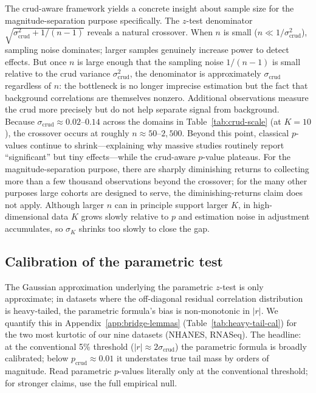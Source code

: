 The crud-aware framework yields a concrete insight about sample size for the magnitude-separation purpose specifically. The $z$-test denominator $\sqrt{\sigma_{\mathrm{crud}}^2 + 1/(n-1)}$ reveals a natural crossover. When $n$ is small ($n \ll 1/\sigma_{\mathrm{crud}}^2$), sampling noise dominates; larger samples genuinely increase power to detect effects. But once $n$ is large enough that the sampling noise $1/(n-1)$ is small relative to the crud variance $\sigma_{\mathrm{crud}}^2$, the denominator is approximately $\sigma_{\mathrm{crud}}$ regardless of $n$: the bottleneck is no longer imprecise estimation but the fact that background correlations are themselves nonzero. Additional observations measure the crud more precisely but do not help separate signal from background.
Because $\sigma_{\mathrm{crud}} \approx 0.02$--$0.14$ across the domains in Table~\ref{tab:crud-scale} (at $K=10$), the crossover occurs at roughly $n \approx 50$--$2{,}500$. Beyond this point, classical $p$-values continue to shrink---explaining why massive studies routinely report ``significant'' but tiny effects---while the crud-aware $p$-value plateaus. For the magnitude-separation purpose, there are sharply diminishing returns to collecting more than a few thousand observations beyond the crossover; for the many other purposes large cohorts are designed to serve, the diminishing-returns claim does not apply.
Although larger $n$ can in principle support larger $K$, in high-dimensional data $K$ grows slowly relative to $p$ and estimation noise in adjustment accumulates, so $\sigma_K$ shrinks too slowly to close the gap.

\subsection{Calibration of the parametric test}
\label{si:parametric-calibration}

The Gaussian approximation underlying the parametric $z$-test is only approximate; in datasets where the off-diagonal residual correlation distribution is heavy-tailed, the parametric formula's bias is non-monotonic in $|r|$. We quantify this in Appendix~\ref{app:bridge-lemmas} (Table~\ref{tab:heavy-tail-cal}) for the two most kurtotic of our nine datasets (NHANES, RNASeq). The headline: at the conventional 5\% threshold ($|r|\approx 2\sigma_{\mathrm{crud}}$) the parametric formula is broadly calibrated; below $p_{\mathrm{crud}}\approx 0.01$ it understates true tail mass by orders of magnitude. Read parametric $p$-values literally only at the conventional threshold; for stronger claims, use the full empirical null.

